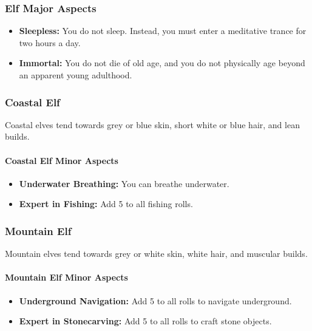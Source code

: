 \begin{multicols}{2}
\subsubsection{Elf Major Aspects}

\begin{itemize}
    \item \textbf{Sleepless:} You do not sleep. Instead, you must enter a meditative trance for two hours a day.
    \item \textbf{Immortal:} You do not die of old age, and you do not physically age beyond an apparent young adulthood.
\end{itemize}

\subsubsection{Coastal Elf}

Coastal elves tend towards grey or blue skin, short white or blue hair, and lean builds.

\paragraph{Coastal Elf Minor Aspects}

\begin{itemize}
    \item \textbf{Underwater Breathing:} You can breathe underwater.
    \item \textbf{Expert in Fishing:} Add 5 to all fishing rolls.
\end{itemize}

\subsubsection{Mountain Elf}

Mountain elves tend towards grey or white skin, white hair, and muscular builds.

\paragraph{Mountain Elf Minor Aspects}

\begin{itemize}
    \item \textbf{Underground Navigation:} Add 5 to all rolls to navigate underground.
    \item \textbf{Expert in Stonecarving:} Add 5 to all rolls to craft stone objects.
\end{itemize}


\end{multicols}
